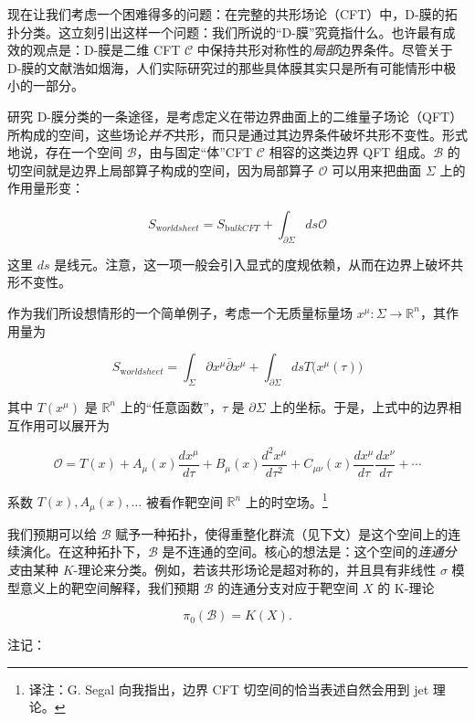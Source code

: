 \documentclass[11pt,a4paper]{ctexart}
\newcommand{\TN}[1]{\footnote{译注：#1}}
\begin{document}
现在让我们考虑一个困难得多的问题：在完整的共形场论（CFT）中，D-膜的拓扑分类。这立刻引出这样一个问题：我们所说的``D-膜''究竟指什么。也许最有成效的观点是：D-膜是二维 CFT \({\mathcal C}\) 中保持共形对称性的\emph{局部}边界条件。尽管关于 D-膜的文献浩如烟海，人们实际研究过的那些具体膜其实只是所有可能情形中极小的一部分。

研究 D-膜分类的一条途径，是考虑定义在带边界曲面上的二维量子场论（QFT）所构成的空间，这些场论\emph{并不}共形，而只是通过其边界条件破坏共形不变性。形式地说，存在一个空间 \({\mathcal B}\)，由与固定``体''CFT \({\mathcal C}\) 相容的这类边界 QFT 组成。\({\mathcal B}\) 的切空间就是边界上局部算子构成的空间，因为局部算子 \({\mathcal O}\) 可以用来把曲面 \(\Sigma\) 上的作用量形变：

\[S_{\mathrm worldsheet} =S_{\mathrm bulk CFT}  + \int_{\partial \Sigma}  ds {\mathcal O}\]

这里 \(ds\) 是线元。注意，这一项一般会引入显式的度规依赖，从而在边界上破坏共形不变性。

作为我们所设想情形的一个简单例子，考虑一个无质量标量场 \(x^\mu:\Sigma\to \mathbb{R}^n\)，其作用量为

\[S_{\mathrm worldsheet} =\int_\Sigma \partial x^\mu \bar{\partial} x^\mu  + \int_{\partial \Sigma}  ds T\bigl(x^\mu(\tau)\bigr)\]

其中 \(T(x^\mu)\) 是 \(\mathbb{R}^n\) 上的``任意函数''，\(\tau\) 是 \(\partial \Sigma\) 上的坐标。于是，上式中的边界相互作用可以展开为

\[{\mathcal O}  = T(x) + A_\mu(x)\frac{dx^\mu}{d \tau} + B_{\mu}(x) \frac{d^2 x^\mu}{d\tau^2} +
C_{\mu\nu}(x) \frac{dx^\mu}{d \tau}  \frac{dx^\nu}{d \tau}   + \cdots\]

系数 \(T(x), A_\mu(x),\dots\) 被看作靶空间 \(\mathbb{R}^n\) 上的时空场。\TN{G. Segal 向我指出，边界 CFT 切空间的恰当表述自然会用到 jet 理论。}

我们预期可以给 \({\mathcal B}\) 赋予一种拓扑，使得重整化群流（见下文）是这个空间上的连续演化。在这种拓扑下，\({\mathcal B}\) 是不连通的空间。核心的想法是：这个空间的\emph{连通分支}由某种 \(K\)-理论来分类。例如，若该共形场论是超对称的，并且具有非线性 \(\sigma\) 模型意义上的靶空间解释，我们预期 \({\mathcal B}\) 的连通分支对应于靶空间 \(X\) 的 K-理论

\[\pi_0({\mathcal B}) = K(X).\]

注记：
\end{document}

